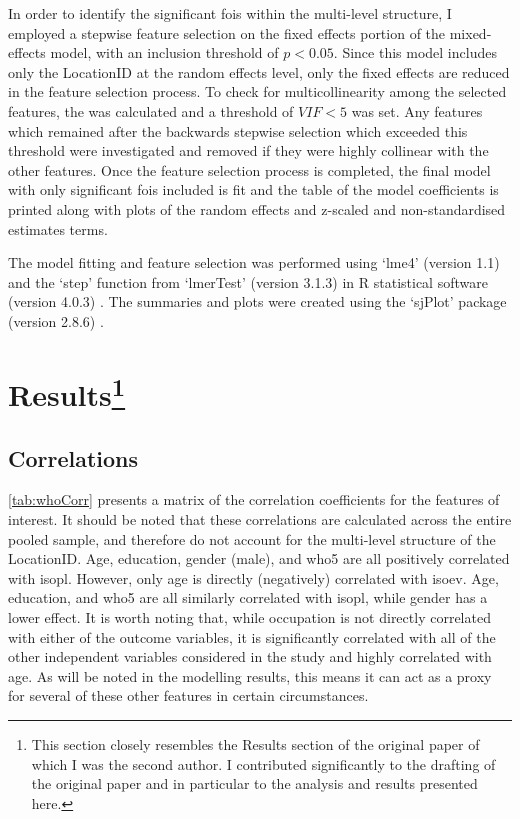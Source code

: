 In order to identify the significant \glspl{foi} within the multi-level structure, I employed a stepwise feature selection on the fixed effects portion of the mixed-effects model, with an inclusion threshold of $p < 0.05$. Since this model includes only the LocationID at the random effects level, only the fixed effects are reduced in the feature selection process. To check for multicollinearity among the selected features, the  was calculated and a threshold of $VIF < 5$ was set. Any features which remained after the backwards stepwise selection which exceeded this threshold were investigated and removed if they were highly collinear with the other features. Once the feature selection process is completed, the final model with only significant \glspl{foi} included is fit and the table of the model coefficients is printed along with plots of the random effects and z-scaled and non-standardised estimates terms.

The model fitting and feature selection was performed using `lme4' (version 1.1) and the `step' function from `lmerTest' (version 3.1.3) \citep{Kuznetsova2017lmerTest} in R statistical software (version 4.0.3) \citep{RCT2018R}. The summaries and plots were created using the `sjPlot' package (version 2.8.6) \citep{Luedecke2021sjPlot}.

\section[Results]{Results\footnote{This section closely resembles the Results section of the original paper \citep{Erfanian2021Psychological} of which I was the second author. I contributed significantly to the drafting of the original paper and in particular to the analysis and results presented here.}}

\subsection{Correlations}

\cref{tab:whoCorr} presents a matrix of the correlation coefficients for the features of interest. It should be noted that these correlations are calculated across the entire pooled sample, and therefore do not account for the multi-level structure of the LocationID. Age, education, gender (male), and \gls{who5} are all positively correlated with \gls{isopl}. However, only age is directly (negatively) correlated with \gls{isoev}. Age, education, and \gls{who5} are all similarly correlated with \gls{isopl}, while gender has a lower effect. It is worth noting that, while occupation is not directly correlated with either of the outcome variables, it is significantly correlated with all of the other independent variables considered in the study and highly correlated with age. As will be noted in the modelling results, this means it can act as a proxy for several of these other features in certain circumstances.

